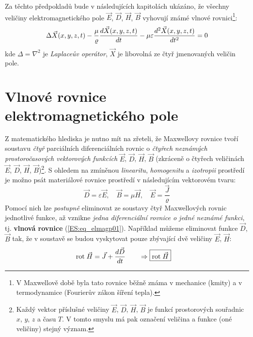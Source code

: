 {  Za těchto předpokladů bude v následujících kapitolách ukázáno, že všechny veličiny 
  elektromagnetického pole \(\vec{E}\), \(\vec{D}\), \(\vec{H}\), \(\vec{B}\) vyhovují známé vlnové 
  rovnici\footnote{V Maxwellově době byla tato rovnice běžně známa v mechanice (kmity) a v 
  termodynamice (Fourierův zákon šíření tepla).}:
  \begin{equation}\label{ES:eq_elmagp01}
    \Delta\vec{X}(x,y,z,t) - 
    \frac{\mu}{\varrho}\dfrac{d \vec{X}(x,y,z,t)}{d t} - 
    \mu\varepsilon\dfrac{d^2 \vec{X}(x,y,z,t)}{d t^2} = 0
  \end{equation}
  kde \(\Delta = \nabla^2\) je \emph{Laplaceův operátor}, \(\vec{X}\) je libovolná ze čtyř 
  jmenovaných veličin pole.
  
  \section{Vlnové rovnice elektromagnetického pole}
    Z matematického hlediska je nutno mít na zřeteli, že Maxwellovy rovnice tvoří soustavu 
    \emph{čtyř} parciálních diferenciálních rovnic o \emph{čtyřech} \emph{neznámých 
    prostoročasových vektorových funkcích} \(\vec{E}\), \(\vec{D}\), \(\vec{H}\), \(\vec{B}\) 
    (zkráceně o čtyřech veličinách \(\vec{E}\), \(\vec{D}\), \(\vec{H}\), 
    \(\vec{B}\))\footnote{Každý vektor příslušné veličiny \(\vec{E}\), \(\vec{D}\), \(\vec{H}\), 
    \(\vec{B}\) je funkcí prostorových souřadnic \(x\), \(y\), \(z\) a času \(T\). V tomto smyslu 
    má pak označení veličina a funkce (oné veličiny) stejný význam.}. S ohledem na zmíněnou 
    \emph{linearitu}, \emph{homogenitu} a \emph{izotropii} prostředí je možno psát materiálové 
    rovnice prostředí v následujícím vektorovém tvaru:
    \begin{equation}\label{ES:eq_elmagp02}
      \vec{D} = \varepsilon\vec{E}, \quad \vec{B} = \mu\vec{H}, \quad \vec{E} = 
      \frac{\vec{J}}{\varrho}
    \end{equation}
    Pomocí nich lze \emph{postupně} eliminovat ze soustavy čtyř Maxwellových rovnic jednotlivé 
    funkce, až vznikne \emph{jedna diferenciální rovnice o jedné neznámé funkci}, tj. 
    \textbf{vlnová rovnice} (\ref{ES:eq_elmagp01}). Například můžeme eliminovat funkce \(\vec{D}\), 
    \(\vec{B}\) tak, že v soustavě se budou vyskytovat pouze zbývající dvě veličiny \(\vec{E}\), 
    \(\vec{H}\):
    \begin{subequations}
      \begin{align}
        \mathrm{rot}\;\vec{H}   &= \vec{J} + \dfrac{d \vec{D}}{d t} 
                     \qquad \Rightarrow \boxed{\mathrm{rot}\;\vec{H} 
}
\end{align}
\end{subequations}}
